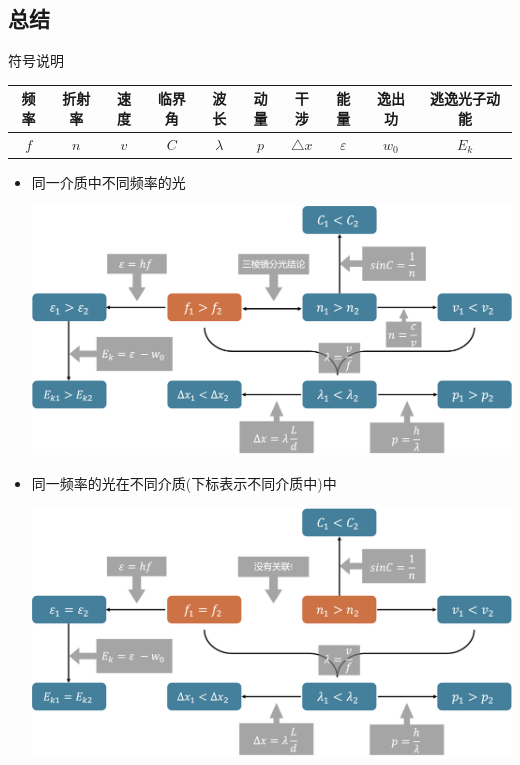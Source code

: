 \documentclass{article}
\begin{document}
\vspace{2em}

\subsection{总结}
\begin{formal}
    符号说明

    \vspace{0.5em}

    \begin{tabular}{|c|c|c|c|c|c|c|c|c|c|}
        \hline
        频率  & 折射率 & 速度  & 临界角 & 波长        & 动量  & 干涉            & 能量            & 逸出功     & 逃逸光子动能  \\
        \hline
        $f$ & $n$ & $v$ & $C$ & $\lambda$ & $p$ & $\triangle x$ & $\varepsilon$ & $w_{0}$ & $E_{k}$ \\
        \hline
    \end{tabular}

    \vspace*{2em}

    \begin{itemize}
        \item 同一介质中不同频率的光

              \vspace*{1em}
              \includegraphics[width=35em,keepaspectratio]{./pictures/2.png}

              \vspace*{2em}

        \item 同一频率的光在不同介质(下标表示不同介质中)中

              \vspace*{1em}
              \includegraphics[width=35em,keepaspectratio]{./pictures/3.png}
    \end{itemize}
\end{formal}
\end{document}
